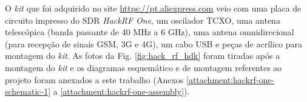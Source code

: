 \documentclass[
  12pt,				%
  openright,			%
  twoside,			%
  a4paper,			%
  english,			%
  french,				%
  spanish,			%
  brazil,				%
  ]{abntex2}
\begin{document}
O \textit{kit} que foi adquirido no site \href{https://pt.aliexpress.com}{https://pt.aliexpress.com} veio com uma placa de circuito impresso do SDR \textit{HackRF One}, um oscilador TCXO,
uma antena telescópica (banda passante de 40 MHz a 6 GHz), uma antena omnidirecional (para recepção de sinais GSM, 3G e 4G), um cabo USB e peças de acrílico para montagem do \textit{kit}. As fotos da Fig.
\ref{fig:hack_rf_hdk} foram tiradas após a montagem do \textit{kit} e os diagramas esquemático e de montagem referentes ao projeto foram anexados a este trabalho (Anexos \ref{attachment:hackrf-one-schematic-1} a \ref{attachment:hackrf-one-assembly}).






\end{document}

